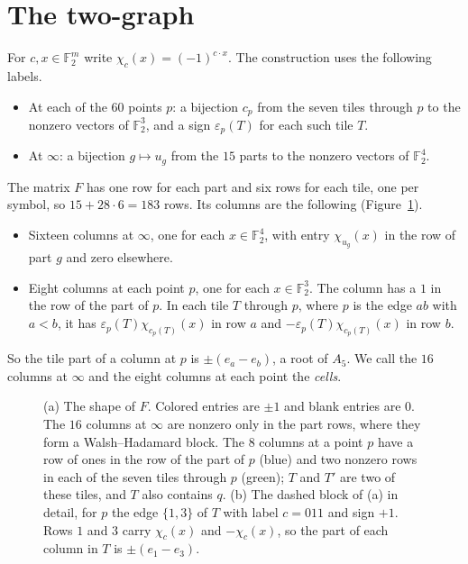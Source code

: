 \documentclass[11pt]{amsart}
\theoremstyle{remark}
\newcommand{\F}{\mathbb{F}}
\begin{document}
\section{The two-graph}\label{sec:frame}

For $c,x\in\F_2^m$ write $\chi_c(x)=(-1)^{c\cdot x}$. The construction uses the following labels.
\begin{itemize}
\item At each of the $60$ points $p$: a bijection $c_p$ from the seven tiles through $p$ to the nonzero vectors of $\F_2^3$, and a sign $\varepsilon_p(T)$ for each such tile $T$.
\item At $\infty$: a bijection $g\mapsto u_g$ from the $15$ parts to the nonzero vectors of $\F_2^4$.
\end{itemize}
The matrix $F$ has one row for each part and six rows for each tile, one per symbol, so $15+28\cdot6=183$ rows. Its columns are the following (Figure~\ref{fig:frame}).
\begin{itemize}
\item Sixteen columns at $\infty$, one for each $x\in\F_2^4$, with entry $\chi_{u_g}(x)$ in the row of part $g$ and zero elsewhere.
\item Eight columns at each point $p$, one for each $x\in\F_2^3$. The column has a $1$ in the row of the part of $p$. In each tile $T$ through $p$, where $p$ is the edge $ab$ with $a<b$, it has $\varepsilon_p(T)\chi_{c_p(T)}(x)$ in row $a$ and $-\varepsilon_p(T)\chi_{c_p(T)}(x)$ in row $b$.
\end{itemize}
So the tile part of a column at $p$ is $\pm(e_a-e_b)$, a root of $A_5$. We call the $16$ columns at $\infty$ and the eight columns at each point the \emph{cells}.

\begin{figure}[t]
\centering
\resizebox{\textwidth}{!}{}
\caption{(a) The shape of $F$. Colored entries are $\pm1$ and blank entries are $0$. The $16$ columns at $\infty$ are nonzero only in the part rows, where they form a Walsh--Hadamard block. The $8$ columns at a point $p$ have a row of ones in the row of the part of $p$ (blue) and two nonzero rows in each of the seven tiles through $p$ (green); $T$ and $T'$ are two of these tiles, and $T$ also contains $q$. (b) The dashed block of (a) in detail, for $p$ the edge $\{1,3\}$ of $T$ with label $c=011$ and sign $+1$. Rows $1$ and $3$ carry $\chi_c(x)$ and $-\chi_c(x)$, so the part of each column in $T$ is $\pm(e_1-e_3)$.}
\label{fig:frame}
\end{figure}
\end{document}
